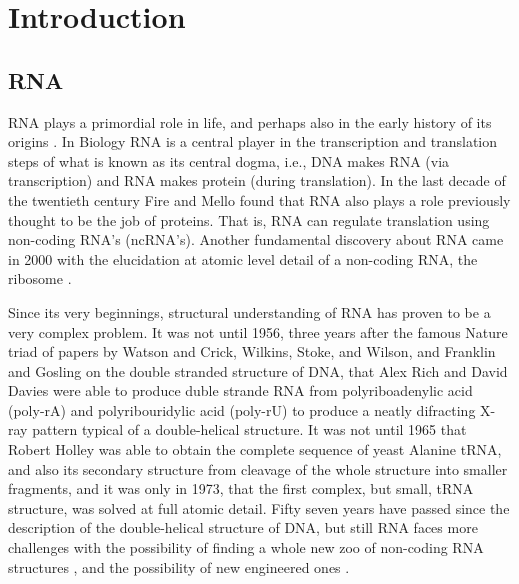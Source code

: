 \chapter{Introduction}
\label{introduction} 

\section{RNA}
RNA plays  a primordial role  in life, and  perhaps also in  the early
history   of  its   origins  \cite{woese1967,   crick1968,  orgel1968,
  orgel2004}. In Biology RNA is  a central player in the transcription
and translation steps of what is known as its central dogma, i.e., DNA
makes  RNA   (via  transcription)   and  RNA  makes   protein  (during
translation).
In  the  last   decade  of  the  twentieth  century   Fire  and  Mello
\cite{fire1998} found that RNA also plays a role previously thought to
be the  job of proteins. That  is, RNA can  regulate translation using
non-coding  RNA's (ncRNA's). Another  fundamental discovery  about RNA
came  in  2000  with the  elucidation  at  atomic  level detail  of  a
non-coding   RNA,    the   ribosome   \cite{schluenzen2000,   ban2000,
  wimberly2000}.

Since its very beginnings,  structural understanding of RNA has proven
to be a very complex problem. It was not until 1956, three years after
the famous Nature triad of papers by Watson and Crick, Wilkins, Stoke,
and Wilson, and Franklin  and Gosling \cite{watson1953a} on the double
stranded structure of  DNA, that Alex Rich and  David Davies were able
to produce duble strande  RNA from polyriboadenylic acid (poly-rA) and
polyribouridylic acid  (poly-rU) to produce a  neatly difracting X-ray
pattern typical of  a double-helical structure. It was  not until 1965
that Robert Holley  was able to obtain the  complete sequence of yeast
Alanine tRNA,  and also its  secondary structure from cleavage  of the
whole structure into smaller fragments,  and it was only in 1973, that
the  first complex,  but small,  tRNA  structure, was  solved at  full
atomic detail.  Fifty seven years have passed since the description of
the  double-helical  structure  of  DNA,  but  still  RNA  faces  more
challenges  with  the  possibility  of  finding a  whole  new  zoo  of
non-coding RNA structures  \cite{weinberg2009}, and the possibility of
new engineered ones \cite{severcan2009}.

